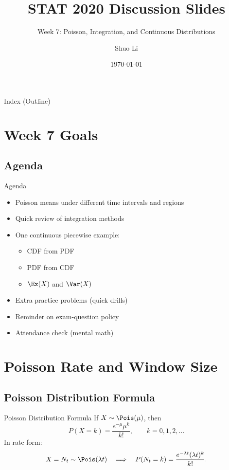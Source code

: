 \documentclass[aspectratio=169]{beamer}
\title[STAT 2020 Week 7 \hfill \insertframenumber/\inserttotalframenumber]{STAT 2020 Discussion Slides}
\subtitle{Week 7: Poisson, Integration, and Continuous Distributions}
\author{Shuo Li}
\institute{University of Iowa}
\date{\today}
\begin{document}
\begin{frame}
  \titlepage
\end{frame}

\begin{frame}{Index (Outline)}
  \tableofcontents[hideallsubsections]
\end{frame}

\section{Week 7 Goals}

\subsection{Agenda}
\begin{frame}{Agenda}
  \begin{itemize}
    \item Poisson means under different time intervals and regions
    \item Quick review of integration methods
    \item One continuous piecewise example:
    \begin{itemize}
      \item CDF from PDF
      \item PDF from CDF
      \item \(\Ex(X)\) and \(\Var(X)\)
    \end{itemize}
    \item Extra practice problems (quick drills)
    \item Reminder on exam-question policy
    \item Attendance check (mental math)
  \end{itemize}
\end{frame}

\section{Poisson Rate and Window Size}

\subsection{Poisson Distribution Formula}
\begin{frame}{Poisson Distribution Formula}
  If \(X\sim\Pois(\mu)\), then
  \[
    P(X=k)=\frac{e^{-\mu}\mu^k}{k!},\qquad k=0,1,2,\dots
  \]
  In rate form:
  \[
    X=N_t\sim\Pois(\lambda t)\quad\Longrightarrow\quad
    P(N_t=k)=\frac{e^{-\lambda t}(\lambda t)^k}{k!}.
  \]
\end{frame}
\end{document}
